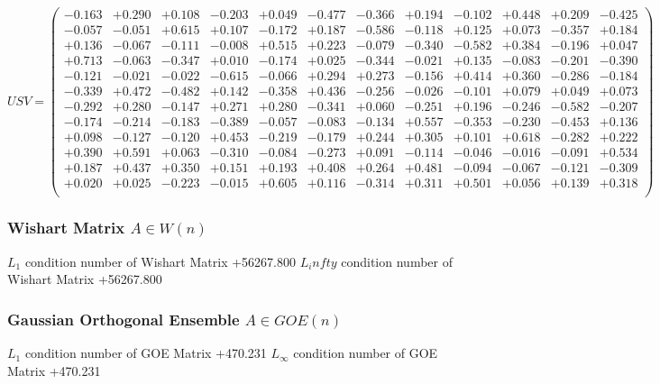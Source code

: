 \documentclass[9pt]{article}
\theoremstyle{plain}
\theoremstyle{definition}
\theoremstyle{remark}
\numberwithin{equation}{section}
\begin{document}
$U S V = \left(
\begin{array}{
cccccccccccc}
-0.163 & +0.290 & +0.108 & -0.203 & +0.049 & -0.477 & -0.366 & +0.194 & -0.102 & +0.448 & +0.209 & -0.425 \\
-0.057 & -0.051 & +0.615 & +0.107 & -0.172 & +0.187 & -0.586 & -0.118 & +0.125 & +0.073 & -0.357 & +0.184 \\
+0.136 & -0.067 & -0.111 & -0.008 & +0.515 & +0.223 & -0.079 & -0.340 & -0.582 & +0.384 & -0.196 & +0.047 \\
+0.713 & -0.063 & -0.347 & +0.010 & -0.174 & +0.025 & -0.344 & -0.021 & +0.135 & -0.083 & -0.201 & -0.390 \\
-0.121 & -0.021 & -0.022 & -0.615 & -0.066 & +0.294 & +0.273 & -0.156 & +0.414 & +0.360 & -0.286 & -0.184 \\
-0.339 & +0.472 & -0.482 & +0.142 & -0.358 & +0.436 & -0.256 & -0.026 & -0.101 & +0.079 & +0.049 & +0.073 \\
-0.292 & +0.280 & -0.147 & +0.271 & +0.280 & -0.341 & +0.060 & -0.251 & +0.196 & -0.246 & -0.582 & -0.207 \\
-0.174 & -0.214 & -0.183 & -0.389 & -0.057 & -0.083 & -0.134 & +0.557 & -0.353 & -0.230 & -0.453 & +0.136 \\
+0.098 & -0.127 & -0.120 & +0.453 & -0.219 & -0.179 & +0.244 & +0.305 & +0.101 & +0.618 & -0.282 & +0.222 \\
+0.390 & +0.591 & +0.063 & -0.310 & -0.084 & -0.273 & +0.091 & -0.114 & -0.046 & -0.016 & -0.091 & +0.534 \\
+0.187 & +0.437 & +0.350 & +0.151 & +0.193 & +0.408 & +0.264 & +0.481 & -0.094 & -0.067 & -0.121 & -0.309 \\
+0.020 & +0.025 & -0.223 & -0.015 & +0.605 & +0.116 & -0.314 & +0.311 & +0.501 & +0.056 & +0.139 & +0.318 \\
\end{array}
\right)$ \newline 

\subsubsection{Wishart Matrix $A \in W(n)$}
$L_1$ condition number of Wishart Matrix +56267.800
$L_infty$ condition number of Wishart Matrix +56267.800
\subsubsection{Gaussian Orthogonal Ensemble $A \in GOE(n)$}
$L_1$ condition number of GOE Matrix +470.231
$L_\infty$ condition number of GOE Matrix +470.231
\end{document}
